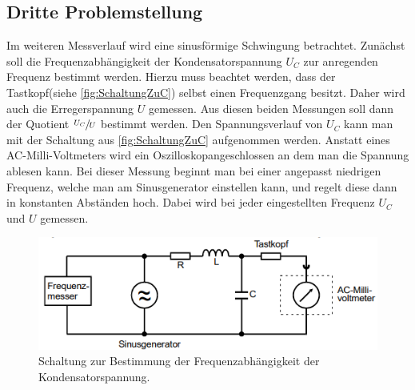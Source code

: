 \subsection{Dritte Problemstellung}
Im weiteren Messverlauf wird eine sinusförmige Schwingung betrachtet. Zunächst soll die Frequenzabhängigkeit der Kondensatorspannung $U_{C}$ zur anregenden Frequenz bestimmt 
werden. Hierzu muss beachtet werden, dass der Tastkopf(siehe \autoref{fig:SchaltungZuC}) selbst einen Frequenzgang besitzt. Daher wird auch die Erregerspannung $U$ gemessen.
Aus diesen beiden Messungen soll dann der Quotient $\sfrac{U_{C}}{U}$ bestimmt werden. Den Spannungsverlauf von  $U_{C}$ kann man mit der Schaltung aus \autoref{fig:SchaltungZuC}
aufgenommen werden. Anstatt eines AC-Milli-Voltmeters wird ein Oszilloskopangeschlossen an dem man die Spannung ablesen kann. Bei dieser Messung beginnt man bei einer angepasst
niedrigen Frequenz, welche man am Sinusgenerator einstellen kann, und regelt diese dann in konstanten Abständen hoch. Dabei wird bei jeder eingestellten Frequenz $U_{C}$ und 
$U$ gemessen. 
\begin{figure}
    \centering
    \includegraphics[width=\textwidth]{content/SchaltungZuC.pdf}
    \caption{Schaltung zur Bestimmung der Frequenzabhängigkeit der Kondensatorspannung.}    
    \label{fig:SchaltungZuC}
\end{figure}
